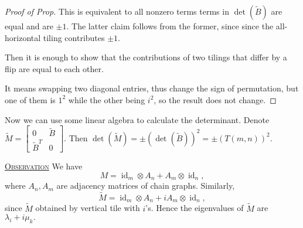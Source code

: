 \documentclass{report}
\def \id {\operatorname{id}}
\newcommand{\fancyem}[1]{\underline{\textsc{#1}}}
\theoremstyle{definition}
\theoremstyle{remark}
\numberwithin{equation}{section}
\begin{document}
\begin{proof}[Proof of Prop]
This is equivalent to all nonzero terms terms in $\det(\tilde{B})$ are equal and are $\pm 1.$ The latter claim follows from the former, since since the all-horizontal tiling contributes $\pm 1$.

Then it is enough to show that the contributions of two tilings that differ by a flip are equal to each other.

It means swapping two diagonal entries, thus change the sign of permutation, but one of them is $1^2$ while the other being $i^2$, so the result does not change.
\end{proof}

Now we can use some linear algebra to calculate the determinant.
Denote $\tilde{M} = \begin{bmatrix}
0 & \tilde{B} \\
\tilde{B}^T & 0
\end{bmatrix}$. Then $\det(\tilde{M}) = \pm (\det(\tilde{B}))^2 = \pm (T(m, n))^2.$

\fancyem{Observation} We have \[M = \id_m \otimes A_n + A_m \otimes \id_n,\] where $A_n, A_m$ are adjacency matrices of chain graphs. Similarly,
\[
\tilde{M} = \id_m \otimes A_n + iA_m \otimes \id_n,
\]
since $\tilde{M}$ obtained by vertical tile with $i$'s. Hence the eigenvalues of $\tilde{M}$ are $\lambda_i + i\mu_k.$
\end{document}
